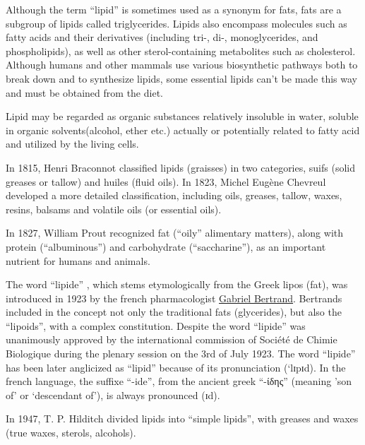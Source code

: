 Although the term ``lipid'' is sometimes used as a synonym for fats, fats are a subgroup of lipids called triglycerides. Lipids also encompass molecules such as fatty acids and their derivatives (including tri-, di-, monoglycerides, and phospholipids), as well as other sterol-containing metabolites such as cholesterol. Although humans and other mammals use various biosynthetic pathways both to break down and to synthesize lipids, some essential lipids can't be made this way and must be obtained from the diet.

Lipid may be regarded as organic substances relatively insoluble in water, soluble in organic solvents(alcohol, ether etc.) actually or potentially related to fatty acid and utilized by the living cells.

In 1815, Henri Braconnot classified lipids (graisses) in two categories, suifs (solid greases or tallow) and huiles (fluid oils). In 1823, Michel Eugène Chevreul developed a more detailed classification, including oils, greases, tallow, waxes, resins, balsams and volatile oils (or essential oils).

In 1827, William Prout recognized fat (``oily'' alimentary matters), along with protein (``albuminous'') and carbohydrate (``saccharine''), as an important nutrient for humans and animals.

The word ``lipide'' , which stems etymologically from the Greek lipos (fat), was introduced in 1923 by the french pharmacologist \href{https://en.wikipedia.org/wiki/Gabriel_Bertrand}{Gabriel Bertrand}. Bertrands included in the concept not only the traditional fats (glycerides), but also the ``lipoids'', with a complex constitution. Despite the word ``lipide'' was unanimously approved by the international commission of Société de Chimie Biologique during the plenary session on the 3rd of July 1923. The word ``lipide'' has been later anglicized as ``lipid'' because of its pronunciation (`lɪpɪd). In the french language, the suffixe ``-ide'', from the ancient greek ``-ίδης'' (meaning 'son of' or `descendant of'), is always pronounced (ɪd).

In 1947, T. P. Hilditch divided lipids into ``simple lipids'', with greases and waxes (true waxes, sterols, alcohols).

